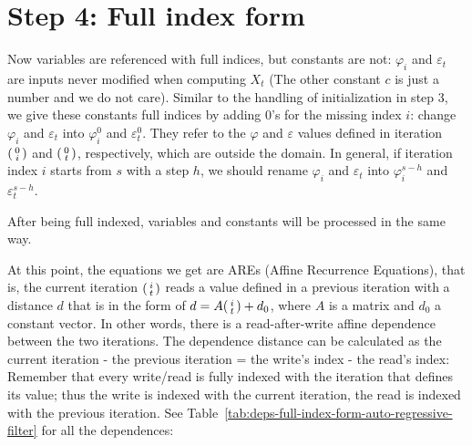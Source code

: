 \section{Step 4: Full index form}

Now variables are referenced with full indices, but constants are not: $\varphi_i$ and $\varepsilon_t$ are inputs never modified when computing $X_t$ (The other constant $c$ is just a number and we do not care). Similar to the handling of initialization in step 3, we give these constants full indices by adding 0's for the missing index $i$:  change $\varphi_i$ and $\varepsilon_t$  into $\varphi_i^0$ and $\varepsilon_t^0$. They refer to the $\varphi$ and $\varepsilon$ values defined in iteration $\begin{psmallmatrix}0\\i\end{psmallmatrix}$ and $\begin{psmallmatrix}0\\t\end{psmallmatrix}$, respectively,  which are outside the domain. In general, if iteration index $i$ starts from $s$ with a step $h$, we should rename $\varphi_i$ and $\varepsilon_t$ into $\varphi_i^{s-h}$ and $\varepsilon_t^{s-h}$.

After being full indexed, variables and constants will be processed in the same way.

At this point, the equations we get are AREs (Affine Recurrence Equations), that is, the current iteration $\begin{psmallmatrix}i\\t\end{psmallmatrix}$ reads a value defined in a previous iteration with a distance $d$ that is in the form of  $d=A\begin{psmallmatrix}i\\t\end{psmallmatrix}+d_0$, where $A$ is a matrix and $d_0$ a constant vector. In other words, there is a read-after-write affine dependence between the two iterations. The dependence distance can be calculated as the current iteration  - the previous iteration  = the write's index - the read's index: Remember that every write/read is fully indexed with the iteration that defines its value; thus the write is indexed with the current iteration, the read is indexed with the previous iteration.  See Table~\ref{tab:deps-full-index-form-auto-regressive-filter} for all the dependences:

